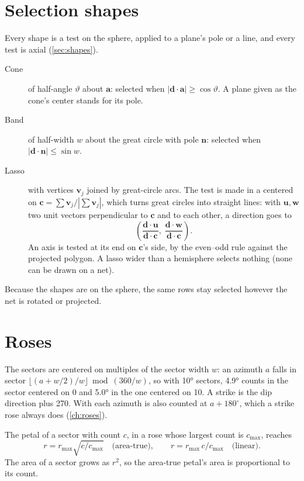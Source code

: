 \section{Selection shapes}\label{sec:m-select}

Every shape is a test on the sphere, applied to a plane's pole or a line, and every test is axial
(\cref{sec:shapes}).
\begin{description}
\item[Cone] of half-angle $\vartheta$ about $\mathbf{a}$: selected when \mbox{$|\mathbf{d}\cdot\mathbf{a}| \ge \cos\vartheta$}. A plane given as the cone's center stands for its pole.
\item[Band] of half-width $w$ about the great circle with pole $\mathbf{n}$: selected when
\mbox{$|\mathbf{d}\cdot\mathbf{n}| \le \sin w$}.
\item[Lasso] with vertices $\mathbf{v}_j$ joined by great-circle arcs. The test is made in a
 centered on $\mathbf{c} = \sum\mathbf{v}_j / |\sum\mathbf{v}_j|$, which
turns great circles into straight lines: with $\mathbf{u}, \mathbf{w}$ two unit vectors perpendicular to
$\mathbf{c}$ and to each other, a direction goes to
\[ \left(\frac{\mathbf{d}\cdot\mathbf{u}}{\mathbf{d}\cdot\mathbf{c}},\; \frac{\mathbf{d}\cdot\mathbf{w}}{\mathbf{d}\cdot\mathbf{c}}\right). \]
An axis is tested at its end on $\mathbf{c}$'s side, by the even--odd rule against the projected polygon.
A lasso wider than a hemisphere selects nothing (none can be drawn on a net).
\end{description}
Because the shapes are on the sphere, the same rows stay selected however the net is rotated or
projected.

\section{Roses}\label{sec:m-rose}

The sectors are centered on multiples of the sector width $w$: an azimuth $a$ falls in sector
$\lfloor (a + w/2)/w \rfloor \bmod (360/w)$, so with 10° sectors, 4.9° counts in the sector centered on
0 and 5.0° in the one centered on 10. A strike is the dip direction plus 270. With 
each azimuth is also counted at $a + 180^\circ$, which a strike rose always does
(\cref{ch:roses}).

The petal of a sector with count $c$, in a rose whose largest count is $c_{\max}$, reaches
\[ r = r_{\max}\sqrt{c/c_{\max}} \quad\mbox{(area-true)}, \qquad r = r_{\max}\,c/c_{\max} \quad\mbox{(linear)}. \]
The area of a sector grows as $r^2$, so the area-true petal's area is proportional to its count.

